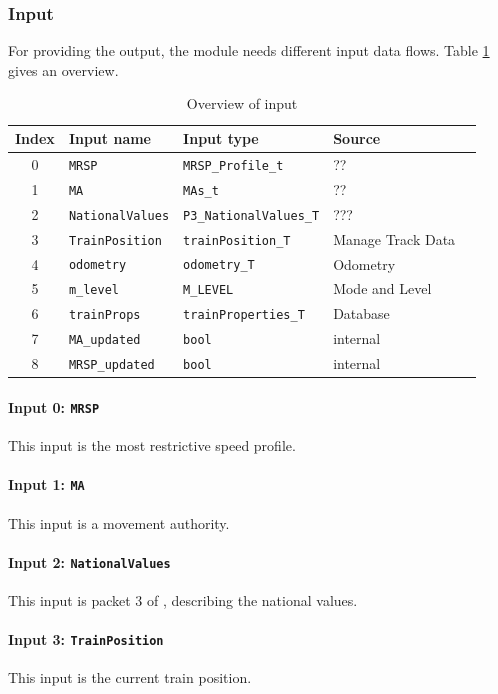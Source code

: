 \subsubsection{Input}
For providing the output, the module needs different input data flows. Table \ref{tbl:speedsupervisionInput} gives an overview.

\begin{table}[H]
  \begin{tabular}{| c | l | l | l | l |}
    \hline
    \textbf{Index} & \textbf{Input name} & \textbf{Input type} & \textbf{Source}\\ \hline
    0 & \texttt{MRSP} & \texttt{MRSP\_Profile\_t} & ?? \\
    1 & \texttt{MA} & \texttt{MAs\_t} & ??\\
    2 & \texttt{NationalValues} & \texttt{P3\_NationalValues\_T} & ???\\
    3 & \texttt{TrainPosition} & \texttt{trainPosition\_T} & Manage Track Data\\
    4 & \texttt{odometry} & \texttt{odometry\_T} & Odometry\\
    5 & \texttt{m\_level} & \texttt{M\_LEVEL} & Mode and Level\\
    6 & \texttt{trainProps} & \texttt{trainProperties\_T} & Database\\
    7 & \texttt{MA\_updated} & \texttt{bool} & internal\\
    8 & \texttt{MRSP\_updated} & \texttt{bool} & internal\\
    \hline
  \end{tabular} 
  \caption{Overview of input}
  \label{tbl:speedsupervisionInput}
\end{table}

\paragraph{Input 0: \texttt{MRSP}}
This input is the most restrictive speed profile.
\paragraph{Input 1: \texttt{MA}}
This input is a movement authority.
\paragraph{Input 2: \texttt{NationalValues}}
This input is packet 3 of \cite[Chapt.~8]{subset-026}, describing the national values. 
\paragraph{Input 3: \texttt{TrainPosition}}
This input is the current train position.
